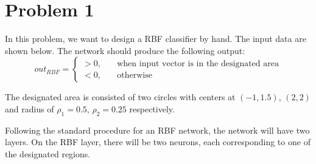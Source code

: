 \section{Problem 1}

In this problem, we want to design a RBF classifier by hand. The input data are shown below. The network should produce the following output:
\[
out_{RBF} = \left\{
\begin{array}{cc}
	> 0,& \quad \text{when input vector is in the designated area}\\
	< 0,& \quad \text{otherwise}
\end{array}
\right.
\]

The designated area is consisted of two circles with centers at $\left( -1, 1.5 \right)$, $\left( 2,2 \right)$ and radius of $\rho_1 = 0.5$, $\rho_2 = 0.25$ respectively.

Following the standard procedure for an RBF network, the network will have two layers. On the RBF layer, there will be two neurons, each corresponding to one of the designated regions.